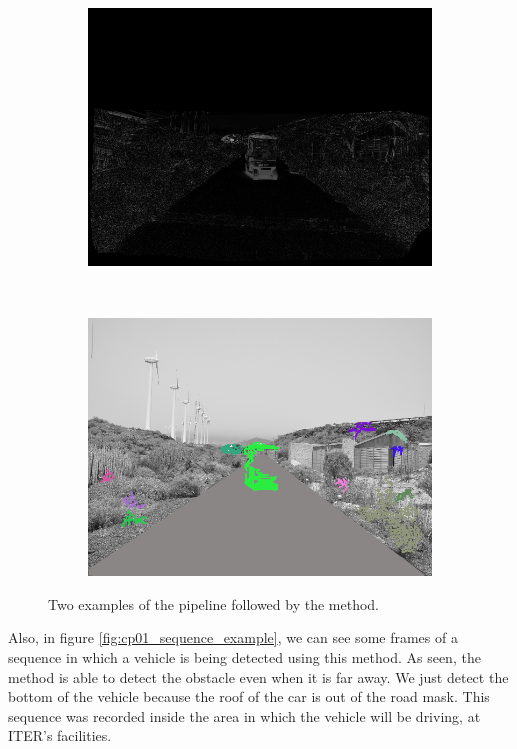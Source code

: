 \begin{figure}[t]
\begin{subfigure}[b]{0.24\columnwidth}
	    \includegraphics[width=\textwidth]{pipeline2/fig4}\label{fig:pipelineB_3}
        \end{subfigure}%
        ~
        \begin{subfigure}[b]{0.24\columnwidth}
	    \includegraphics[width=\textwidth]{pipeline2/fig5}\label{fig:pipelineB_4}
        \end{subfigure}%
        \caption{Two examples of the pipeline followed by the method.}\label{fig:cp01_pipeline_example}
\end{figure}

Also, in figure \ref{fig:cp01_sequence_example}, we can see some frames of a sequence in which a vehicle is being detected using this method. As seen, the method is able to detect the obstacle even when it is far away. We just detect the bottom of the vehicle because the roof of the car is out of the road mask. This sequence was recorded inside the area in which the vehicle will be driving, at ITER's facilities.

